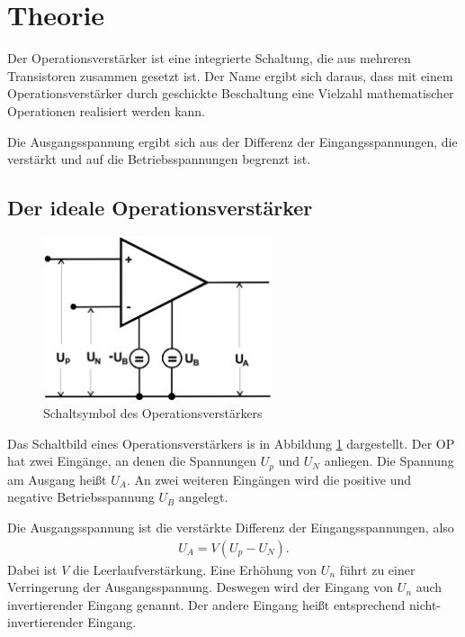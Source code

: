 \section{Theorie}

Der Operationsverstärker ist eine integrierte Schaltung, die aus mehreren Transistoren zusammen gesetzt ist.
Der Name ergibt sich daraus, dass mit einem Operationsverstärker durch geschickte Beschaltung eine Vielzahl mathematischer Operationen realisiert werden kann.

Die Ausgangsspannung ergibt sich aus der Differenz der Eingangsspannungen, die verstärkt und auf die Betriebsspannungen begrenzt ist.

\subsection{Der ideale Operationsverstärker}

\begin{figure}
	\centering
	\includegraphics[width=0.6\textwidth]{img/op.png}
	\caption{Schaltsymbol des Operationsverstärkers \cite{v51}}
	\label{fig:op}
\end{figure}

Das Schaltbild eines Operationsverstärkers is in Abbildung \ref{fig:op} dargestellt.
Der OP hat zwei Eingänge, an denen die Spannungen $U_p$ und $U_N$ anliegen.
Die Spannung am Ausgang heißt $U_A$.
An zwei weiteren Eingängen wird die positive und negative Betriebsspannung $U_B$ angelegt.

Die Ausgangsspannung ist die verstärkte Differenz der Eingangsspannungen, also
\begin{align}
	U_A = V \left(U_p - U_N\right).
\end{align}
Dabei ist $V$ die Leerlaufverstärkung.
Eine Erhöhung von $U_n$ führt zu einer Verringerung der Ausgangsspannung.
Deswegen wird der Eingang von $U_n$ auch invertierender Eingang genannt.
Der andere Eingang heißt entsprechend nicht-invertierender Eingang.

